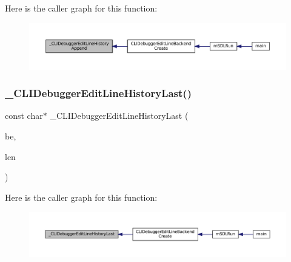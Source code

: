 Here is the caller graph for this function\+:
\nopagebreak
\begin{figure}[H]
\begin{center}
\leavevmode
\includegraphics[width=350pt]{cli-el-backend_8c_a5676d6c82d7fd2e118185b8abe763611_icgraph}
\end{center}
\end{figure}
\mbox{\label{cli-el-backend_8c_a57e17a93bb3ab3f8c5c9226aeb775d57}} 
\subsubsection{\texorpdfstring{\+\_\+\+C\+L\+I\+Debugger\+Edit\+Line\+History\+Last()}{\_CLIDebuggerEditLineHistoryLast()}}
{\footnotesize\ttfamily const char$\ast$ \+\_\+\+C\+L\+I\+Debugger\+Edit\+Line\+History\+Last (\begin{DoxyParamCaption}\item[{struct C\+L\+I\+Debugger\+Backend $\ast$}]{be,  }\item[{size\+\_\+t $\ast$}]{len }\end{DoxyParamCaption})}

Here is the caller graph for this function\+:
\nopagebreak
\begin{figure}[H]
\begin{center}
\leavevmode
\includegraphics[width=350pt]{cli-el-backend_8c_a57e17a93bb3ab3f8c5c9226aeb775d57_icgraph}
\end{center}
\end{figure}
\mbox{\label{cli-el-backend_8c_a3dbc196c9232924e24cd18830e794588}} 
